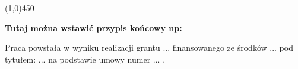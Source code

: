 \newpage

\begin{center}
\line(1,0){450}
\end{center}

\textbf{Tutaj można wstawić przypis końcowy np:}

Praca powstała w wyniku realizacji grantu ... finansowanego ze środków ... pod tytułem: ... na podstawie umowy numer ... . 